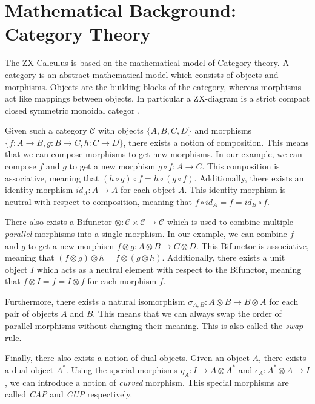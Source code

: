 
\section{Mathematical Background: Category Theory}

The ZX-Calculus is based on the mathematical model of Category-theory. A category is an abstract mathematical model which consists of objects and morphisms. Objects are the building blocks of the category, whereas morphisms act like mappings
between objects. In particular a ZX-diagram is a strict compact
closed symmetric monoidal categor \cite{emmanueljeandel2020zx}.

Given such a category $\mathcal{C}$ with objects $\{A,B,C,D\}$ and morphisms $\{f: A \rightarrow B, g: B \rightarrow C, h: C \rightarrow D\}$, there exists a notion of composition. This means that we can compose morphisms to get new morphisms. In our example, we can compose $f$ and $g$ to get a new morphism $g \circ f: A \rightarrow C$. This composition is associative, meaning that $(h \circ g) \circ f = h \circ (g \circ f)$. Additionally, there exists an identity morphism $id_A: A \rightarrow A$ for each object $A$. This identity morphism is neutral with respect to composition, meaning that $f \circ id_A = f = id_B \circ f$.

There also exists a Bifunctor $\otimes:\mathcal{C}\times\mathcal{C}\rightarrow\mathcal{C}$ which is used to combine multiple \textit{parallel} morphisms into a single morphism. In our example, we can combine $f$ and $g$ to get a new morphism $f \otimes g: A \otimes B \rightarrow C \otimes D$. This Bifunctor is associative, meaning that $(f \otimes g) \otimes h = f \otimes (g \otimes h)$. Additionally, there exists a unit object $I$ which acts as a neutral element with respect to the Bifunctor, meaning that $f \otimes I = f = I \otimes f$ for each morphism $f$.

Furthermore, there exists a natural isomorphism $\sigma_{A,B}: A \otimes B \rightarrow B \otimes A$ for each pair of objects $A$ and $B$. This means that we can always swap the order of parallel morphisms without changing their meaning. This is also called the \textit{swap} rule.


Finally, there also exists a notion of dual objects. Given an object $A$, there exists a dual object $A^*$. Using the special morphisms $\eta_A: I \rightarrow A \otimes A^*$ and $\epsilon_A: A^* \otimes A \rightarrow I$, we can introduce a notion of \textit{curved} morphism. This special morphisms are called \textit{CAP} and \textit{CUP} respectively.

